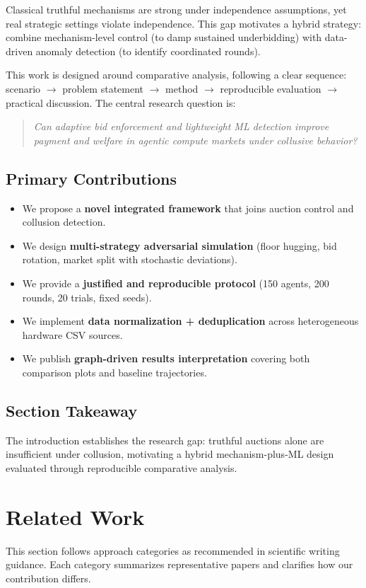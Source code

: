 \documentclass[journal]{IEEEtran}
\begin{document}
Classical truthful mechanisms are strong under independence assumptions, yet real strategic settings violate independence. This gap motivates a hybrid strategy: combine mechanism-level control (to damp sustained underbidding) with data-driven anomaly detection (to identify coordinated rounds).

This work is designed around comparative analysis, following a clear sequence: scenario $\rightarrow$ problem statement $\rightarrow$ method $\rightarrow$ reproducible evaluation $\rightarrow$ practical discussion. The central research question is:
\begin{quote}
\emph{Can adaptive bid enforcement and lightweight ML detection improve payment and welfare in agentic compute markets under collusive behavior?}
\end{quote}

\subsection{Primary Contributions}
\begin{itemize}[leftmargin=*]
    \item We propose a \textbf{novel integrated framework} that joins auction control and collusion detection.
    \item We design \textbf{multi-strategy adversarial simulation} (floor hugging, bid rotation, market split with stochastic deviations).
    \item We provide a \textbf{justified and reproducible protocol} (150 agents, 200 rounds, 20 trials, fixed seeds).
    \item We implement \textbf{data normalization + deduplication} across heterogeneous hardware CSV sources.
    \item We publish \textbf{graph-driven results interpretation} covering both comparison plots and baseline trajectories.
\end{itemize}

\subsection{Section Takeaway}
The introduction establishes the research gap: truthful auctions alone are insufficient under collusion, motivating a hybrid mechanism-plus-ML design evaluated through reproducible comparative analysis.

\section{Related Work}
This section follows approach categories as recommended in scientific writing guidance. Each category summarizes representative papers and clarifies how our contribution differs.
\end{document}
